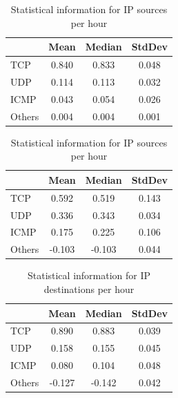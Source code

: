 \documentclass{article}
\begin{document}
\begin{table}[H]
    \parbox{.45\linewidth}{
        \centering
        \begin{tabular}{l|ccc}
                & Mean  & Median & StdDev \\
                   \hline
            TCP    & 0.840 & 0.833  & 0.048 \\
            UDP    & 0.114 & 0.113  & 0.032 \\
            ICMP   & 0.043 & 0.054  & 0.026 \\
            Others & 0.004 & 0.004  & 0.001 \\
        \end{tabular}
        \caption{\label{table:rep-17-packets} Statistical information for Packets per hour}
    }
    \parbox{.1\linewidth}{}
    \parbox{.45\linewidth}{
        \centering
        \begin{tabular}{l|ccc}
                   & Mean  & Median & StdDev \\
                   \hline
            TCP    &   0.592 & 0.519  & 0.143  \\
            UDP    &   0.336 & 0.343  & 0.034  \\
            ICMP   &   0.175 & 0.225  & 0.106  \\
            Others &  -0.103 & -0.103 & 0.044  \\
        \end{tabular}
        \caption{\label{table:rep-17-ips} Statistical information for IP sources per hour}
    }
\end{table}

\begin{table}[H]
    \centering
    \begin{tabular}{l|ccc}
               & Mean  & Median & StdDev \\
               \hline
        TCP    &  0.890 & 0.883&  0.039   \\
        UDP    &  0.158 & 0.155&  0.045   \\
        ICMP   &  0.080 & 0.104&  0.048   \\
        Others &  -0.127&  -0.142&  0.042 \\
    \end{tabular}
    \caption{\label{table:rep-17-ipd} Statistical information for IP destinations per hour}
\end{table}

\end{document}
